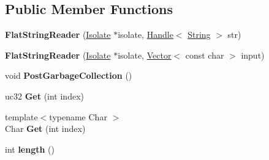 \subsection*{Public Member Functions}
\begin{DoxyCompactItemize}
\item 
{\bfseries Flat\+String\+Reader} (\hyperlink{classv8_1_1internal_1_1_isolate}{Isolate} $\ast$isolate, \hyperlink{classv8_1_1internal_1_1_handle}{Handle}$<$ \hyperlink{classv8_1_1internal_1_1_string}{String} $>$ str)\hypertarget{classv8_1_1internal_1_1_flat_string_reader_ae2b7accc58c68221f7b45520b544cd64}{}\label{classv8_1_1internal_1_1_flat_string_reader_ae2b7accc58c68221f7b45520b544cd64}

\item 
{\bfseries Flat\+String\+Reader} (\hyperlink{classv8_1_1internal_1_1_isolate}{Isolate} $\ast$isolate, \hyperlink{classv8_1_1internal_1_1_vector}{Vector}$<$ const char $>$ input)\hypertarget{classv8_1_1internal_1_1_flat_string_reader_af3203553f086dd868b51f25b8bddbbcb}{}\label{classv8_1_1internal_1_1_flat_string_reader_af3203553f086dd868b51f25b8bddbbcb}

\item 
void {\bfseries Post\+Garbage\+Collection} ()\hypertarget{classv8_1_1internal_1_1_flat_string_reader_a34cb461fd78aeaecc370c7583ce64589}{}\label{classv8_1_1internal_1_1_flat_string_reader_a34cb461fd78aeaecc370c7583ce64589}

\item 
uc32 {\bfseries Get} (int index)\hypertarget{classv8_1_1internal_1_1_flat_string_reader_a7499abcea8aef7a95d961141a1219db9}{}\label{classv8_1_1internal_1_1_flat_string_reader_a7499abcea8aef7a95d961141a1219db9}

\item 
{\footnotesize template$<$typename Char $>$ }\\Char {\bfseries Get} (int index)\hypertarget{classv8_1_1internal_1_1_flat_string_reader_a04cb3a9f7a8b8ab35f310eab0895f97c}{}\label{classv8_1_1internal_1_1_flat_string_reader_a04cb3a9f7a8b8ab35f310eab0895f97c}

\item 
int {\bfseries length} ()\hypertarget{classv8_1_1internal_1_1_flat_string_reader_af402065726c67b6223a3f09df2156a45}{}\label{classv8_1_1internal_1_1_flat_string_reader_af402065726c67b6223a3f09df2156a45}

\end{DoxyCompactItemize}
